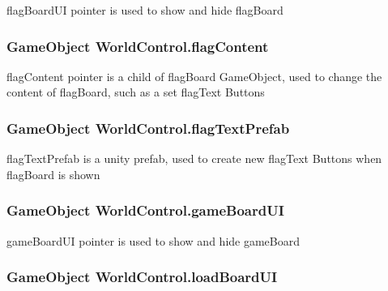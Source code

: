 flag\+Board\+UI pointer is used to show and hide flag\+Board 

\subsubsection[{\texorpdfstring{flag\+Content}{flagContent}}]{\setlength{\rightskip}{0pt plus 5cm}Game\+Object World\+Control.\+flag\+Content}\hypertarget{class_world_control_a1da3147270eacb9ab3bda530708a8790}{}\label{class_world_control_a1da3147270eacb9ab3bda530708a8790}


flag\+Content pointer is a child of flag\+Board Game\+Object, used to change the content of flag\+Board, such as a set flag\+Text Buttons 

\subsubsection[{\texorpdfstring{flag\+Text\+Prefab}{flagTextPrefab}}]{\setlength{\rightskip}{0pt plus 5cm}Game\+Object World\+Control.\+flag\+Text\+Prefab}\hypertarget{class_world_control_a1f4c229d757e5caa8cbfb633acefd609}{}\label{class_world_control_a1f4c229d757e5caa8cbfb633acefd609}


flag\+Text\+Prefab is a unity prefab, used to create new flag\+Text Buttons when flag\+Board is shown 

\subsubsection[{\texorpdfstring{game\+Board\+UI}{gameBoardUI}}]{\setlength{\rightskip}{0pt plus 5cm}Game\+Object World\+Control.\+game\+Board\+UI}\hypertarget{class_world_control_a596eb15f8e1fd7dc89f3ee9f2e24666e}{}\label{class_world_control_a596eb15f8e1fd7dc89f3ee9f2e24666e}


game\+Board\+UI pointer is used to show and hide game\+Board 

\subsubsection[{\texorpdfstring{load\+Board\+UI}{loadBoardUI}}]{\setlength{\rightskip}{0pt plus 5cm}Game\+Object World\+Control.\+load\+Board\+UI}\hypertarget{class_world_control_a8bda427ef163decb5417991038f3c0ee}{}\label{class_world_control_a8bda427ef163decb5417991038f3c0ee}


